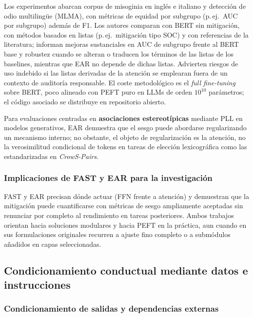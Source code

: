 \documentclass[12pt,a4paper]{report}
\begin{document}
Los experimentos abarcan corpus de misoginia en inglés e italiano y detección de odio multilingüe (MLMA), con métricas de equidad por subgrupo (p.\,ej.\ AUC por subgrupo) además de F1. Los autores comparan con BERT sin mitigación, con métodos basados en listas (p.\,ej.\ mitigación tipo SOC) y con referencias de la literatura; informan mejoras sustanciales en AUC de subgrupo frente al BERT base y robustez cuando se alteran o traducen los términos de las listas de los baselines, mientras que EAR no depende de dichas listas. Advierten riesgos de uso indebido si las listas derivadas de la atención se emplearan fuera de un contexto de auditoría responsable. El coste metodológico es el \textit{full fine-tuning} sobre BERT, poco alineado con PEFT puro en LLMs de orden \(10^{10}\) parámetros; el código asociado se distribuye en repositorio abierto.

Para evaluaciones centradas en \textbf{asociaciones estereotípicas} mediante PLL en modelos generativos, EAR demuestra que el sesgo puede abordarse regularizando un mecanismo interno; no obstante, el objeto de regularización es la atención, no la verosimilitud condicional de tokens en tareas de elección lexicográfica como las estandarizadas en \textit{CrowS-Pairs}.

\subsubsection{Implicaciones de FAST y EAR para la investigación}

FAST y EAR precisan dónde actuar (FFN frente a atención) y demuestran que la mitigación puede cuantificarse con métricas de sesgo ampliamente aceptadas sin renunciar por completo al rendimiento en tareas posteriores. Ambos trabajos orientan hacia soluciones modulares y hacia PEFT en la práctica, aun cuando en sus formulaciones originales recurren a ajuste fino completo o a submódulos añadidos en capas seleccionadas.

\subsection{Condicionamiento conductual mediante datos e instrucciones}
\label{subsec:sintesis_condicionamiento_conductual}

\subsubsection{Condicionamiento de salidas y dependencias externas}
\end{document}
